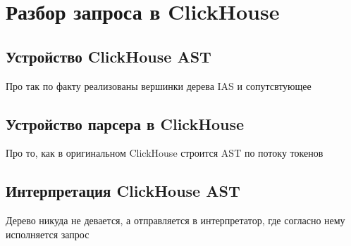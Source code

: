 \section{Разбор запроса в ClickHouse}
\subsection{Устройство ClickHouse AST}
Про так по факту реализованы вершинки дерева IAS и сопутсвтующее

\subsection{Устройство парсера в ClickHouse}
Про то, как в оригинальном ClickHouse строится AST по потоку токенов

\subsection{Интерпретация ClickHouse AST}
Дерево никуда не девается, а отправляется в интерпретатор, где согласно нему исполняется запрос


\pagebreak

